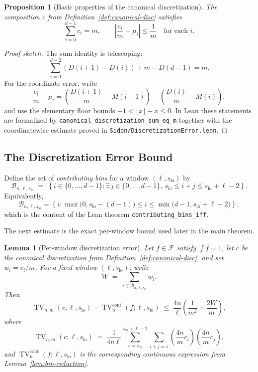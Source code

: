 \documentclass[11pt, letterpaper]{article}
\theoremstyle{paperplain}
\newtheorem{lemma}[theorem]{Lemma}
\newtheorem{proposition}[theorem]{Proposition}
\theoremstyle{paperdef}
\begin{document}
\begin{proposition}[Basic properties of the canonical discretization]
\label{prop:canonical-disc-basic}
The composition $c$ from Definition~\ref{def:canonical-disc} satisfies
\[
  \sum_{i=0}^{d-1} c_i = m,
  \qquad
  \left| \frac{c_i}{m} - \mu_i \right| \le \frac{1}{m}
  \quad\text{for each } i.
\]
\end{proposition}

\begin{proof}[Proof sketch]
The sum identity is telescoping:
\[
  \sum_{i=0}^{d-2} (D(i+1)-D(i)) + m-D(d-1) = m.
\]
For the coordinate error, write
\[
  \frac{c_i}{m}-\mu_i
  =
  \left(\frac{D(i+1)}{m}-M(i+1)\right)
  -
  \left(\frac{D(i)}{m}-M(i)\right),
\]
and use the elementary floor bounds
$-1<\lfloor x\rfloor-x\le 0$.  In Lean these statements are formalized
by \texttt{canonical\_discretization\_sum\_eq\_m} together with the
coordinatewise estimate proved in
\texttt{Sidon/DiscretizationError.lean}.
\end{proof}

\subsection{The Discretization Error Bound}

Define the set of \emph{contributing bins} for a window
$(\ell,s_{\mathrm{lo}})$ by
\[
  \mathcal{B}_{n,\ell,s_{\mathrm{lo}}}
  \;=\;
  \left\{
    i\in\{0,\dots,d-1\} :
    \exists\, j\in\{0,\dots,d-1\},\
    s_{\mathrm{lo}}\le i+j\le s_{\mathrm{lo}}+\ell-2
  \right\}.
\]
Equivalently,
\[
  \mathcal{B}_{n,\ell,s_{\mathrm{lo}}}
  =
  \left\{
    i :
    \max\!\bigl(0,s_{\mathrm{lo}}-(d-1)\bigr)
    \le i \le
    \min\!\bigl(d-1,s_{\mathrm{lo}}+\ell-2\bigr)
  \right\},
\]
which is the content of the Lean theorem
\texttt{contributing\_bins\_iff}.

The next estimate is the exact per-window bound used later in the main
theorem.

\begin{lemma}[Per-window discretization error]
\label{lem:disc-error}
Let $f\in\mathcal{F}$ satisfy $\int f=1$, let
$c$ be the canonical discretization from
Definition~\ref{def:canonical-disc}, and set
$w_i=c_i/m$.  For a fixed window $(\ell,s_{\mathrm{lo}})$, write
\[
  W \;=\; \sum_{i\in \mathcal{B}_{n,\ell,s_{\mathrm{lo}}}} w_i.
\]
Then
\[
  \operatorname{TV}_{n,m}(c;\ell,s_{\mathrm{lo}})
  -
  \operatorname{TV}^{\mathrm{cont}}_n(f;\ell,s_{\mathrm{lo}})
  \;\le\;
  \frac{4n}{\ell}
  \left(
    \frac{1}{m^2} + \frac{2W}{m}
  \right),
\]
where
\[
  \operatorname{TV}_{n,m}(c;\ell,s_{\mathrm{lo}})
  \;=\;
  \frac{1}{4n\ell}
  \sum_{s=s_{\mathrm{lo}}}^{s_{\mathrm{lo}}+\ell-2}
  \sum_{i+j=s}
  \left(\frac{4n}{m}c_i\right)\left(\frac{4n}{m}c_j\right),
\]
and $\operatorname{TV}^{\mathrm{cont}}_n(f;\ell,s_{\mathrm{lo}})$ is
the corresponding continuous expression from
Lemma~\ref{lem:bin-reduction}.
\end{lemma}
\end{document}
